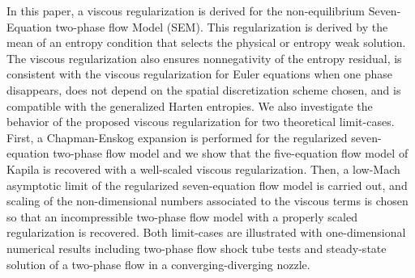 In this paper, a viscous regularization is derived for the non-equilibrium Seven-Equation two-phase flow Model (SEM). This regularization is derived by the mean of an entropy condition that selects the physical
or entropy weak solution. The viscous regularization also ensures nonnegativity of the entropy 
residual, is consistent with the viscous regularization for Euler equations when one phase disappears, does not depend on the spatial discretization scheme 
chosen, and is compatible with the generalized Harten entropies. We also investigate the behavior of the proposed viscous regularization for two 
theoretical limit-cases. First, a Chapman-Enskog expansion is performed for the regularized seven-equation two-phase flow model and we show that the five-equation flow 
model of Kapila is recovered with a well-scaled viscous regularization. Then, a low-Mach asymptotic limit of the regularized seven-equation flow model is carried out, and scaling of the non-dimensional numbers
associated to the viscous terms is chosen so that 
an incompressible two-phase flow model with a properly scaled regularization is recovered. Both limit-cases are illustrated with one-dimensional numerical results including two-phase flow shock tube tests
and steady-state solution of a two-phase flow in a converging-diverging nozzle.